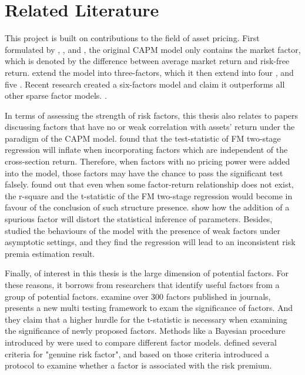 	\section{Related Literature}\label{Literature}

This project is built on contributions to the field of asset pricing.
First formulated by , , and , the original CAPM model only contains the market factor, which is denoted by the difference between average market return and risk-free return.
 extend the model into three-factors, which it then extend into four \cite{Carhart1997}, and five \cite{Fama2015}.
Recent research created a six-factors model and claim it outperforms all other sparse factor models. \cite{Kelly2019}.

In terms of assessing the strength of risk factors, this thesis also relates to papers discussing factors that have no or weak correlation with assets' return under the paradigm of the CAPM model.
 found that the test-statistic of FM two-stage regression  \cite{Fama1973} will inflate when incorporating factors which are independent of the cross-section return.
Therefore, when factors with no pricing power were added into the model, those factors may have the chance to pass the significant test falsely.
 found out that even when some factor-return relationship does not exist, the r-square and the t-statistic of the FM two-stage regression would become in favour of the conclusion of such structure presence. 
 show how the addition of a spurious factor will distort the statistical inference of parameters.
Besides,  studied the behaviours of the model with the presence of weak factors under asymptotic settings, and they find the regression will lead to an inconsistent risk premia estimation result.
	
	
Finally, of interest in this thesis is the large dimension of potential factors.
For these reasons, it borrows from researchers that identify useful factors from a group of potential factors.
 examine over 300 factors published in journals, presents a new multi testing framework to exam the significance of factors.
And they claim that a higher hurdle for the t-statistic is necessary when examining the significance of newly proposed factors.
Methods like a Bayesian procedure introduced by  were used to compare different factor models.
 defined several criteria for "genuine risk factor", and based on those criteria introduced a protocol to examine whether a factor is associated with the risk premium.

